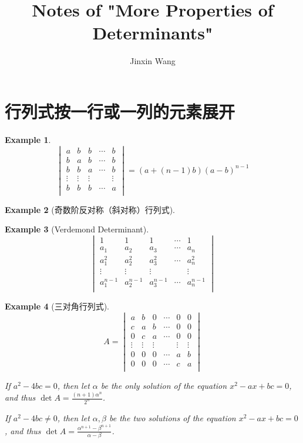 \documentclass[onecolumn]{ctexart}
\title{Notes of "More Properties of Determinants"}
\author{Jinxin Wang}
\date{}
\newtheorem{example}{Example}
\begin{document}
\maketitle

\section{行列式按一行或一列的元素展开}

\begin{example}
\[
  \begin{vmatrix}
    a & b & b & \cdots & b \\
    b & a & b & \cdots & b \\
    b & b & a & \cdots & b \\
    \vdots & \vdots & \vdots & & \vdots \\
    b & b & b & \cdots & a \\
  \end{vmatrix} = (a + (n - 1)b)(a - b)^{n-1}
\]
\end{example}

\begin{example}[奇数阶反对称（斜对称）行列式]
  
\end{example}

\begin{example}[Verdemond Determinant]
\[
  \begin{vmatrix}
    1 & 1 & 1 & \cdots & 1 \\
    a_1 & a_2 & a_3 & \cdots & a_n \\
    a_1^2 & a_2^2 & a_3^2 & \cdots & a_n^2 \\
    \vdots & \vdots & \vdots & & \vdots \\
    a_1^{n-1} & a_2^{n-1} & a_3^{n-1} & \cdots & a_n^{n-1} \\
  \end{vmatrix}
\]  
\end{example}

\begin{example}[三对角行列式]
\[
  A = 
  \begin{vmatrix}
    a & b & 0 & \cdots & 0 & 0 \\
    c & a & b & \cdots & 0 & 0 \\
    0 & c & a & \cdots & 0 & 0 \\
    \vdots & \vdots & \vdots & & \vdots & \vdots \\
    0 & 0 & 0 & \cdots & a & b \\
    0 & 0 & 0 & \cdots & c & a \\
  \end{vmatrix}
\]

If $a^2 - 4bc = 0$, then let $\alpha$ be the only solution of the equation 
$x^2 - ax + bc = 0$, and thus $\det A = \frac{(n+1)\alpha^n}{2^n}$.

If $a^2 - 4bc \neq 0$, then let $\alpha, \beta$ be the two solutions of the 
equation $x^2 - ax + bc = 0$, and thus $\det A = 
\frac{\alpha^{n+1} - \beta^{n+1}}{\alpha - \beta}$.
\end{example}
\end{document}
